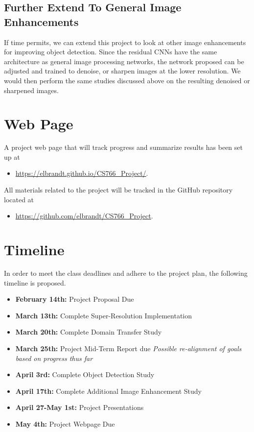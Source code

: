 \documentclass{article}
\begin{document}
\subsection{Further Extend To General Image Enhancements}
If time permits, we can extend this project to look at other image enhancements for improving object detection. Since the residual CNNs have the same architecture as general image processing networks, the network proposed can be adjusted and trained to denoise, or sharpen images at the lower resolution. We would then perform the same studies discussed above on the resulting denoised or sharpened images.


\section{Web Page}
A project web page that will track progress and summarize results has been set up at 
\begin{itemize}
    \item \url{https://elbrandt.github.io/CS766_Project/}.
\end{itemize}

\noindent All materials related to the project will be tracked in the GitHub repository located at 

\begin{itemize}
    \item \url{https://github.com/elbrandt/CS766_Project}.
\end{itemize}


\section{Timeline}
In order to meet the class deadlines and adhere to the project plan, the following timeline is proposed.

\begin{itemize}
    \item \textbf{February 14th:} Project Proposal Due 
    \item \textbf{March 13th:} Complete Super-Resolution Implementation
    \item \textbf{March 20th:} Complete Domain Transfer Study
    \item \textbf{March 25th:} Project Mid-Term Report due \textit{Possible re-alignment of goals based on progress thus far}
    \item \textbf{April 3rd:} Complete Object Detection Study
    \item \textbf{April 17th:} Complete Additional Image Enhancement Study
    \item \textbf{April 27-May 1st:} Project Presentations
    \item \textbf{May 4th:} Project Webpage Due
\end{itemize}


\printbibliography
\end{document}
